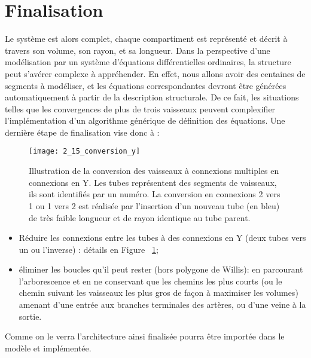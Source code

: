 \section{Finalisation}
\label{sec:finalisation}
Le système est alors complet, chaque compartiment est représenté et décrit à travers son volume,
son rayon, et sa longueur. Dans la perspective d’une modélisation par un système d’équations
différentielles ordinaires, la structure peut s’avérer complexe à appréhender. En effet, nous allons
avoir des centaines de segments à modéliser, et les équations correspondantes devront être générées
automatiquement à partir de la description structurale. De ce fait, les situations telles que les
convergences de plus de trois vaisseaux peuvent complexifier l’implémentation d’un algorithme
générique de définition des équations. Une dernière étape de finalisation vise donc à :
\begin{figure}[!t]
\centering
\texttt{[image: 2\_15\_conversion\_y]}
\caption{Illustration de la conversion des vaisseaux à connexions multiples en connexions en Y. Les tubes représentent des
segments de vaisseaux, ils sont identifiés par un numéro. La conversion en connexions 2 vers 1 ou 1 vers 2 est réalisée par
l’insertion d’un nouveau tube (en bleu) de très faible longueur et de rayon identique au tube parent.
}
\label{fig:2_15_conversion_y}	
\end{figure}	
\begin{itemize}
\item Réduire les connexions entre les tubes à des connexions en Y (deux tubes vers un ou
l’inverse) : détails en Figure ~\ref{fig:2_15_conversion_y};
\item éliminer les boucles qu’il peut rester (hors polygone de Willis): en parcourant l’arborescence
et en ne conservant que les chemins les plus courts (ou le chemin suivant les vaisseaux les
plus gros de façon à maximiser les volumes) amenant d’une entrée aux branches terminales
des artères, ou d’une veine à la sortie.
\end{itemize}
Comme on le verra l’architecture ainsi finalisée pourra être importée dans le modèle et implémentée.


{}
